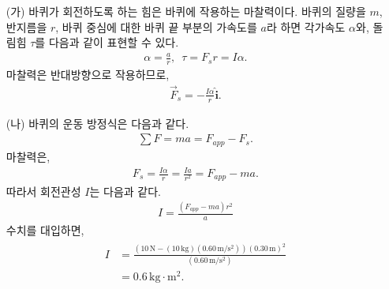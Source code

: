 \documentclass[floatfix,nofootinbib,superscriptaddress,fleqn]{revtex4-2}
\begin{document}
\begin{itemize}
  \item[(가)] 바퀴가 회전하도록 하는 힘은 바퀴에 작용하는 마찰력이다.
  바퀴의 질량을 $m$, 반지름을 $r$, 바퀴 중심에 대한 바퀴 끝 부분의 가속도를 
  $a$라 하면
  각가속도 $\alpha$와, 돌림힘 $\tau$를 다음과 같이 표현할 수 있다.
  \begin{align}
    \alpha=\frac{a}{r},\,\,\, \tau = F_s r = I\alpha.
  \end{align}
  마찰력은 반대방향으로 작용하므로,
  \begin{align}
    \vec{F}_s = -\frac{I\alpha}{r}\hat{\bm i}.
  \end{align}
  \item[(나)]
  바퀴의 운동 방정식은 다음과 같다.
  \begin{align}
    \sum F = ma = F_{app} - F_s.
  \end{align}
  마찰력은,
  \begin{align}
    F_s=\frac{I\alpha}{r} = \frac{Ia}{r^2} = F_{app}-ma.
  \end{align}
따라서 회전관성 $I$는 다음과 같다.
\begin{align}
  I = \frac{(F_{app}-ma)r^2}{a}
\end{align}
  수치를 대입하면,
  \begin{align}
    \begin{split}
      I &= \frac{(10\,\mathrm{N} - (10\,\mathrm{kg})(0.60\,\mathrm{m/s^2}))
      (0.30\,\mathrm{m})^2}{(0.60\,\mathrm{m/s^2})} \\
      &=0.6\,\mathrm{kg\cdot m^2}.
    \end{split}
  \end{align}
\end{itemize}

\vspace{1.cm}
\end{document}
